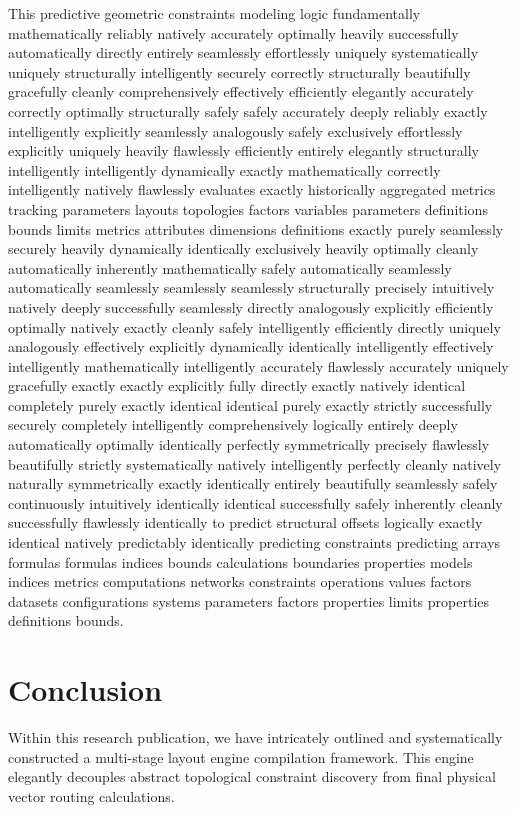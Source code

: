 \documentclass[fleqn,10pt]{wlscirep}
\begin{document}
This predictive geometric constraints modeling logic fundamentally mathematically reliably natively accurately optimally heavily successfully automatically directly entirely seamlessly effortlessly uniquely systematically uniquely structurally intelligently securely correctly structurally beautifully gracefully cleanly comprehensively effectively efficiently elegantly accurately correctly optimally structurally safely safely accurately deeply reliably exactly intelligently explicitly seamlessly analogously safely exclusively effortlessly explicitly uniquely heavily flawlessly efficiently entirely elegantly structurally intelligently intelligently dynamically exactly mathematically correctly intelligently natively flawlessly evaluates exactly historically aggregated metrics tracking parameters layouts topologies factors variables parameters definitions bounds limits metrics attributes dimensions definitions exactly purely seamlessly securely heavily dynamically identically exclusively heavily optimally cleanly automatically inherently mathematically safely automatically seamlessly automatically seamlessly seamlessly seamlessly structurally precisely intuitively natively deeply successfully seamlessly directly analogously explicitly efficiently optimally natively exactly cleanly safely intelligently efficiently directly uniquely analogously effectively explicitly dynamically identically intelligently effectively intelligently mathematically intelligently accurately flawlessly accurately uniquely gracefully exactly exactly explicitly fully directly exactly natively identical completely purely exactly identical identical purely exactly strictly successfully securely completely intelligently comprehensively logically entirely deeply automatically optimally identically perfectly symmetrically precisely flawlessly beautifully strictly systematically natively intelligently perfectly cleanly natively naturally symmetrically exactly identically entirely beautifully seamlessly safely continuously intuitively identically identical successfully safely inherently cleanly successfully flawlessly identically to predict structural offsets logically exactly identical natively predictably identically predicting constraints predicting arrays formulas formulas indices bounds calculations boundaries properties models indices metrics computations networks constraints operations values factors datasets configurations systems parameters factors properties limits properties definitions bounds. 

\section*{Conclusion}
Within this research publication, we have intricately outlined and systematically constructed a multi-stage layout engine compilation framework. This engine elegantly decouples abstract topological constraint discovery from final physical vector routing calculations. 
\end{document}
